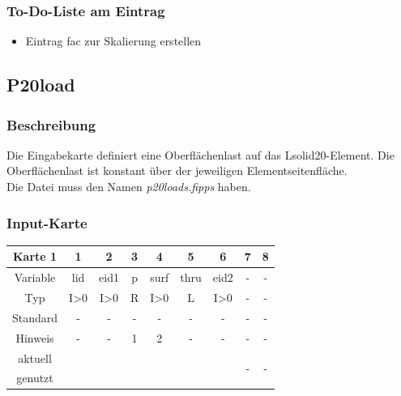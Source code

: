 \documentclass[11pt,titlepage,listof=totoc,bibliography=totoc,twoside]{scrreprt}
\begin{document}
{{\subsubsection{To-Do-Liste am Eintrag}

\begin{itemize}
\item Eintrag fac zur Skalierung erstellen
\end{itemize}

\newpage

\subsection{P20load}

\subsubsection{Beschreibung}

Die Eingabekarte definiert eine Oberflächenlast auf das Lsolid20-Element. Die Oberflächenlast ist konstant über der jeweiligen Elementseitenfläche.\\
Die Datei muss den Namen \emph{p20loads.fipps} haben.

\subsubsection{Input-Karte}

\begin{table}[htbp]
\centering
\begin{tabularx}{\textwidth}{cCCCCCCCC}
\toprule
Karte 1         & 1     & 2          & 3          & 4     & 5     & 6     & 7  & 8  \\
\midrule
Variable        & lid   & eid1       & p          & surf  & thru  & eid2  & -  & -  \\
Typ             & I>0   & I>0        & R          & I>0   & L     & I>0   & -  & -  \\
Standard        & -     & -          & -          & -     & -     & -     & -  & -  \\
Hinweis         & -     & -          & 1          & 2     & -     & -     & -  & -  \\
aktuell         &  &  &  &   &   &   &   &   \\
genutzt \\
\bottomrule
\end{tabularx}
\end{table}

}}
\end{document}

